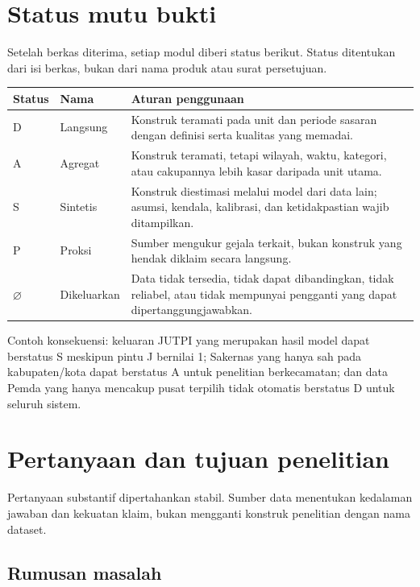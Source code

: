 \documentclass[10pt]{article}
\begin{document}
\section{Status mutu bukti}

Setelah berkas diterima, setiap modul diberi status berikut. Status ditentukan dari isi berkas, bukan dari nama produk atau surat persetujuan.

\begin{tabularx}{\textwidth}{@{}P{0.08\textwidth}P{0.18\textwidth}Y@{}}
\toprule
Status & Nama & Aturan penggunaan \\
\midrule
D & Langsung & Konstruk teramati pada unit dan periode sasaran dengan definisi serta kualitas yang memadai. \\
A & Agregat & Konstruk teramati, tetapi wilayah, waktu, kategori, atau cakupannya lebih kasar daripada unit utama. \\
S & Sintetis & Konstruk diestimasi melalui model dari data lain; asumsi, kendala, kalibrasi, dan ketidakpastian wajib ditampilkan. \\
P & Proksi & Sumber mengukur gejala terkait, bukan konstruk yang hendak diklaim secara langsung. \\
$\varnothing$ & Dikeluarkan & Data tidak tersedia, tidak dapat dibandingkan, tidak reliabel, atau tidak mempunyai pengganti yang dapat dipertanggungjawabkan. \\
\bottomrule
\end{tabularx}

Contoh konsekuensi: keluaran JUTPI yang merupakan hasil model dapat berstatus S meskipun pintu J bernilai 1; Sakernas yang hanya sah pada kabupaten/kota dapat berstatus A untuk penelitian berkecamatan; dan data Pemda yang hanya mencakup pusat terpilih tidak otomatis berstatus D untuk seluruh sistem.

\section{Pertanyaan dan tujuan penelitian}

Pertanyaan substantif dipertahankan stabil. Sumber data menentukan kedalaman jawaban dan kekuatan klaim, bukan mengganti konstruk penelitian dengan nama dataset.

\subsection{Rumusan masalah}
\end{document}
